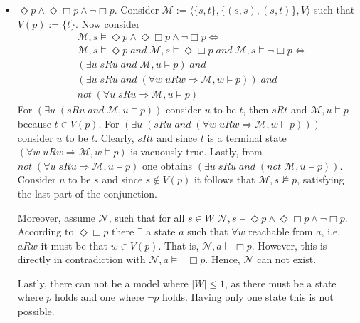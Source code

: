\documentclass[11pt,a4paper]{article}
\newcommand{\some}{\Diamond}
\newcommand{\all}{\Box}
\newcommand{\sand}{\; and \;}
\newcommand{\sneg}{not \;}
\newcommand{\sto}{\Rightarrow}
\begin{document}
\begin{itemize}
\item $\some p \land \some \all p \land \neg \all p$. Consider $\mathcal{M}:=\langle \{s,t\}, \{(s,s),(s,t)\}, V\rangle$ such that $V(p):=\{t\}$. Now consider
\begin{equation*}
\begin{split}
&\mathcal{M}, s \models \some p \land \some \all p \land \neg \all p  \iff \\
&\mathcal{M}, s \models \some p \sand \mathcal{M}, s \models \some \all p \sand \mathcal{M}, s \models \neg \all p \iff \\
&(\exists u \; sRu \sand \mathcal{M}, u \models  p) \sand \\
&( \exists u \; sRu \sand (\forall w \; uRw \sto \mathcal{M}, w \models  p)) \sand \\
&\sneg (\forall u \; sRu \sto \mathcal{M}, u \models p)
\end{split}
\end{equation*}
For $(\exists u \; (sRu \sand \mathcal{M}, u \models  p))$ consider $u$ to be $t$, then $sRt$ and $\mathcal{M}, u \models  p$ because $t \in V(p)$. For $( \exists u \; (sRu \sand (\forall w \; uRw \sto \mathcal{M}, w \models  p)))$  consider $u$ to be $t$. Clearly, $sRt$ and since $t$ is a terminal state $(\forall w \; uRw \sto \mathcal{M}, w \models  p)$ is vacuously true. Lastly, from $\sneg (\forall u \; sRu \sto \mathcal{M}, u \models p)$ one obtains $ (\exists u \; sRu \sand( \sneg \mathcal{M}, u \models p))$. Consider $u$ to be $s$ and since $s \notin V(p)$ it follows that $\mathcal{M}, s \nvDash p$, satisfying the last part of the conjunction. 

Moreover, assume $\mathcal{N}$, such that for all $s \in W$ $\mathcal{N},s \models \some p \land \some \all p \land \neg \all p$. According to $\some \all p $ there $\exists$ a state $a$ such that $\forall w$ reachable from $a$, i.e. $aRw$ it must be that $w \in V(p)$. That is, $\mathcal{N},a \models \all p$. However, this is directly in contradiction with $\mathcal{N},a \models  \neg \all p$. Hence, $\mathcal{N}$ can not exist.

Lastly, there can not be a model where $|W|\leq 1$, as there must be a state where $p$ holds and one where $\neg p$ holds. Having only one state this is not possible.


\end{itemize}
\end{document}
